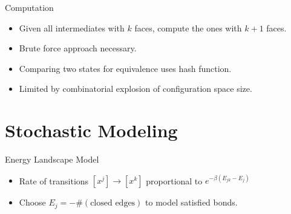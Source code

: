 \documentclass{beamer}
\begin{document}
\begin{frame}{Computation}
\begin{itemize}
\item Given all intermediates with $k$ faces, compute the ones with $k+1$ faces.
\item Brute force approach necessary.  
\item Comparing two states for equivalence uses hash function. 
\item Limited by combinatorial explosion of configuration space size.
\end{itemize}
\end{frame}

\section{Stochastic Modeling}
\begin{frame}{Energy Landscape Model}
  \centering
\begin{itemize}
\item Rate of transitions $[x^j] \to [x^k]$ proportional to $e^{-\beta(E_{jk} - E_j)}$
\item Choose $E_j = -\#\left(\text{closed edges}\right)$ to model satisfied bonds.
\end{itemize} 
\end{frame}
\end{document}
